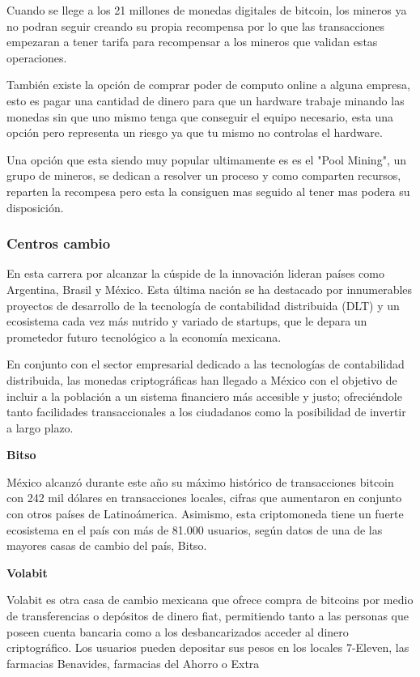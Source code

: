 \documentclass[12pt,letterpaper]{article}
\begin{document}
Cuando se llege a los 21 millones de monedas digitales de bitcoin, los mineros ya no podran seguir creando su propia recompensa por lo que las transacciones empezaran a tener tarifa para recompensar a los mineros que validan estas operaciones.

	Tambi\'en existe la opci\'on de comprar poder de computo online a alguna empresa, esto es pagar una cantidad de dinero para que un hardware trabaje minando las monedas sin que uno mismo tenga que conseguir el equipo necesario, esta una opci\'on pero representa un riesgo ya que tu mismo no controlas el hardware.
	
	Una opci\'on que esta siendo muy popular ultimamente es es el "Pool Mining", un grupo de mineros, se dedican a resolver un proceso y como comparten recursos, reparten la recompesa pero esta la consiguen mas seguido al tener mas podera su disposici\'on.
	
		\subsubsection*{Centros cambio}
En esta carrera por alcanzar la c\'uspide de la innovaci\'on lideran pa\'ises como Argentina, Brasil y M\'exico. Esta \'ultima naci\'on se ha destacado por innumerables proyectos de desarrollo de la tecnolog\'ia de contabilidad distribuida (DLT) y un ecosistema cada vez m\'as nutrido y variado de startups, que le depara un prometedor futuro tecnol\'ogico a la econom\'ia mexicana.		

En conjunto con el sector empresarial dedicado a las tecnolog\'ias de contabilidad distribuida, las monedas criptogr\'aficas han llegado a M\'exico con el objetivo de incluir a la poblaci\'on a un sistema financiero m\'as accesible y justo; ofreci\'endole tanto facilidades transaccionales a los ciudadanos como la posibilidad de invertir a largo plazo.

\textbf{Bitso}

M\'exico alcanz\'o durante este año su m\'aximo hist\'orico de transacciones bitcoin con 242 mil d\'olares en transacciones locales, cifras que aumentaron en conjunto con otros pa\'ises de Latino\'america. Asimismo, esta criptomoneda tiene un fuerte ecosistema en el pa\'is con m\'as de 81.000 usuarios, seg\'un datos de una de las mayores casas de cambio del pa\'is, Bitso.

\textbf{Volabit}

Volabit es otra casa de cambio mexicana que ofrece compra de bitcoins por medio de transferencias o dep\'ositos de dinero fiat, permitiendo tanto a las personas que poseen cuenta bancaria como a los desbancarizados acceder al dinero criptogr\'afico. Los usuarios pueden depositar sus pesos en los locales 7-Eleven, las farmacias Benavides, farmacias del Ahorro o Extra
\end{document}
